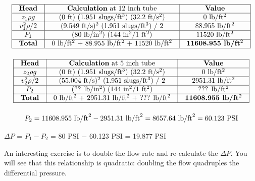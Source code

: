 

$$\vbox{\offinterlineskip
\halign{\strut
\vrule \quad\hfil # \ \hfil & 
\vrule \quad\hfil # \ \hfil & 
\vrule \quad\hfil # \ \hfil \vrule \cr
\noalign{\hrule}
%
{\bf Head} & {\bf Calculation} at 12 inch tube & {\bf Value} \cr
%
\noalign{\hrule}
%
$z_1 \rho g$ & (0 ft) (1.951 slugs/ft$^{3}$) (32.2 ft/s$^{2}$) & 0 lb/ft$^{2}$ \cr
%
\noalign{\hrule}
%
$v_1^2 \rho / 2$ & (9.549 ft/s)$^{2}$ (1.951 slugs/ft$^{3}$) / 2 & 88.955 lb/ft$^{2}$ \cr
%
\noalign{\hrule}
%
$P_1$ & (80 lb/in$^{2}$) (144 in$^{2}$/1 ft$^{2}$) & 11520 lb/ft$^{2}$ \cr
%
\noalign{\hrule}
%
{\bf Total} &  0 lb/ft$^{2}$ + 88.955 lb/ft$^{2}$ + 11520 lb/ft$^{2}$ & {\bf 11608.955 lb/ft$^{2}$} \cr
%
\noalign{\hrule}
} %
}$$ %

\vskip 10pt


$$\vbox{\offinterlineskip
\halign{\strut
\vrule \quad\hfil # \ \hfil & 
\vrule \quad\hfil # \ \hfil & 
\vrule \quad\hfil # \ \hfil \vrule \cr
\noalign{\hrule}
%
{\bf Head} & {\bf Calculation} at 5 inch tube & {\bf Value} \cr
%
\noalign{\hrule}
%
$z_2 \rho g$ & (0 ft) (1.951 slugs/ft$^{3}$) (32.2 ft/s$^{2}$) & 0 lb/ft$^{2}$ \cr
%
\noalign{\hrule}
%
$v_2^2 \rho / 2$ & (55.004 ft/s)$^{2}$ (1.951 slugs/ft$^{3}$) / 2 & 2951.31 lb/ft$^{2}$ \cr
%
\noalign{\hrule}
%
$P_2$ & (?? lb/in$^{2}$) (144 in$^{2}$/1 ft$^{2}$) & ??? lb/ft$^{2}$ \cr
%
\noalign{\hrule}
%
{\bf Total} &  0 lb/ft$^{2}$ + 2951.31 lb/ft$^{2}$ + ??? lb/ft$^{2}$ & {\bf 11608.955 lb/ft$^{2}$} \cr
%
\noalign{\hrule}
} %
}$$ %

$$P_2 = 11608.955 \hbox{ lb/ft}^2 - 2951.31 \hbox{ lb/ft}^2 = 8657.64 \hbox{ lb/ft}^2 = 60.123 \hbox{ PSI}$$

\vskip 10pt

$\Delta P$ = $P_1 - P_2$ = 80 PSI $-$ 60.123 PSI = 19.877 PSI

\vskip 10pt

An interesting exercise is to double the flow rate and re-calculate the $\Delta P$.  You will see that this relationship is quadratic: doubling the flow quadruples the differential pressure.




